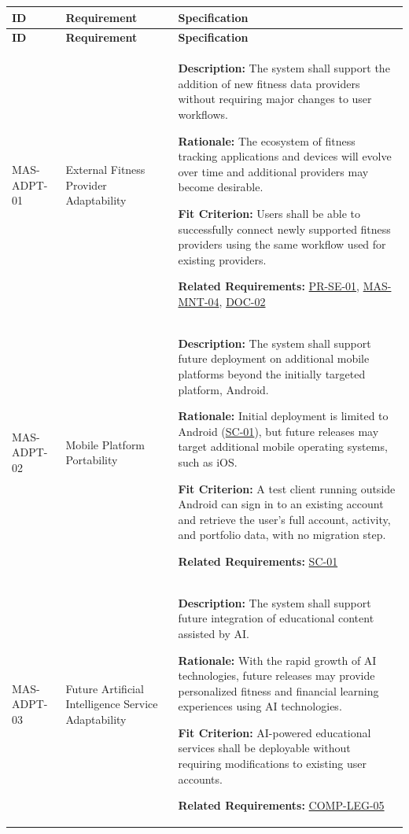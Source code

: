 \documentclass[12pt]{article}
\begin{document}
\small
\setlength{\tabcolsep}{4pt}
\begin{xltabular}{\textwidth}{|p{2.6cm}|p{3.4cm}|X|}
\hline
\textbf{ID} & \textbf{Requirement} & \textbf{Specification} \\
\hline
\endfirsthead
\hline
\textbf{ID} & \textbf{Requirement} & \textbf{Specification} \\
\hline
\endhead

MAS-ADPT-01\hypertarget{req:MAS-ADPT-01}{} &
External Fitness Provider Adaptability &
\textbf{Description:} The system shall support the addition of new fitness data providers without requiring major changes to user workflows.

\textbf{Rationale:} The ecosystem of fitness tracking applications and devices will evolve over time and additional providers may become desirable.

\textbf{Fit Criterion:} Users shall be able to successfully connect newly supported fitness providers using the same workflow used for existing providers.

\textbf{Related Requirements:} \hyperlink{req:PR-SE-01}{PR-SE-01}, \hyperlink{req:MAS-MNT-04}{MAS-MNT-04}, \hyperlink{req:DOC-02}{DOC-02}\\
\hline

MAS-ADPT-02\hypertarget{req:MAS-ADPT-02}{} &
Mobile Platform Portability &
\textbf{Description:} The system shall support future deployment on additional mobile platforms beyond the initially targeted platform, Android.

\textbf{Rationale:} Initial deployment is limited to Android (\hyperlink{req:SC-01}{SC-01}), but future releases may target additional mobile operating systems, such as iOS.

\textbf{Fit Criterion:} A test client running outside Android can sign in to an existing account and retrieve the user's full account, activity, and portfolio data, with no migration step.

\textbf{Related Requirements:} \hyperlink{req:SC-01}{SC-01}\\
\hline

MAS-ADPT-03\hypertarget{req:MAS-ADPT-03}{} &
Future Artificial Intelligence Service Adaptability &
\textbf{Description:} The system shall support future integration of educational content assisted by AI.

\textbf{Rationale:} With the rapid growth of AI technologies, future releases may provide personalized fitness and financial learning experiences using AI technologies.

\textbf{Fit Criterion:} AI-powered educational services shall be deployable without requiring modifications to existing user accounts.

\textbf{Related Requirements:} \hyperlink{req:COMP-LEG-05}{COMP-LEG-05}\\
\hline

\end{xltabular}
\end{document}
